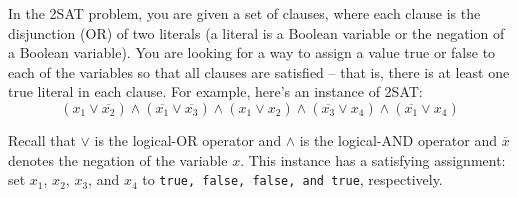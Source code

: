 \documentclass[10.5pt]{article}
\begin{document}
\pagebreak
{}

In the 2SAT problem, you are given a set of clauses, where each clause is the disjunction (\textsc{OR}) of
two literals (a literal is a Boolean variable or the negation of a Boolean variable). You are looking
for a way to assign a value true or false to each of the variables so that all clauses are satisfied -- that is, there is at least one true literal in each clause. For example, here's an instance of 2SAT:
$$(x_1 \vee \overline{x_2} ) \wedge (\overline{x_1} \vee \overline{x_3} ) \wedge (x_1 \vee x_2 ) \wedge (\overline{x_3} \vee x_4 ) \wedge (\overline{x_1} \vee x_4)$$

Recall that $\vee$ is the logical-OR operator and $\wedge$ is the logical-AND operator and $\overline{x}$ denotes the negation of the variable $x$. This instance has a satisfying assignment: set $x_1$, $x_2$, $x_3$, and $x_4$ to \texttt{true, false, false, and
true}, respectively.
\end{document}
